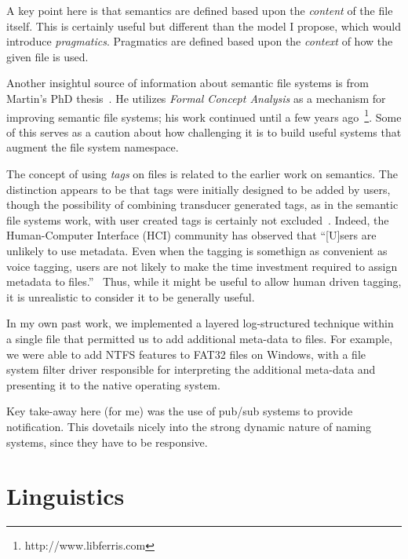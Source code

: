 A key point here is that semantics are defined based upon the \emph{content} of
the file itself. This is certainly useful but different than the model I
propose, which would introduce \emph{pragmatics}.  Pragmatics are defined based
upon the \emph{context} of how the given file is used.

Another insightul source of information about semantic file systems is from
Martin's PhD thesis~\cite{martin2008}.  He utilizes \emph{Formal Concept
    Analysis} as a mechanism for improving semantic file systems; his work continued
until a few years ago~\footnote{http://www.libferris.com}.  Some of this serves
as a caution about how challenging it is to build useful systems that augment
the file system namespace.


The concept of using \emph{tags} on files is related to the earlier work on
semantics.  The distinction appears to be that tags were initially designed to
be added by users, though the possibility of combining transducer generated
tags, as in the semantic file systems work, with user created tags is certainly
not excluded~\cite{tagfs}.  Indeed, the Human-Computer Interface (HCI) community
has observed that ``[U]sers are unlikely to use metadata.  Even when the tagging
is somethign as convenient as voice tagging, users are not likely to make the
time investment required to assign metadata to
files.''~\cite{10.1145/642611.642682}  Thus, while it might be useful to allow
human driven tagging, it is unrealistic to consider it to be generally useful.


In my own past work, we implemented a layered log-structured technique within a
single file that permitted us to add additional meta-data to files.  For
example, we were able to add NTFS features to FAT32 files on Windows, with a
file system filter driver responsible for interpreting the additional meta-data
and presenting it to the native operating system.




Key take-away here (for me) was the use of pub/sub systems to provide
notification.  This dovetails nicely into the strong dynamic nature of naming
systems, since they have to be responsive.

\section{Linguistics}
\label{ch:background:sec:linguistics}

